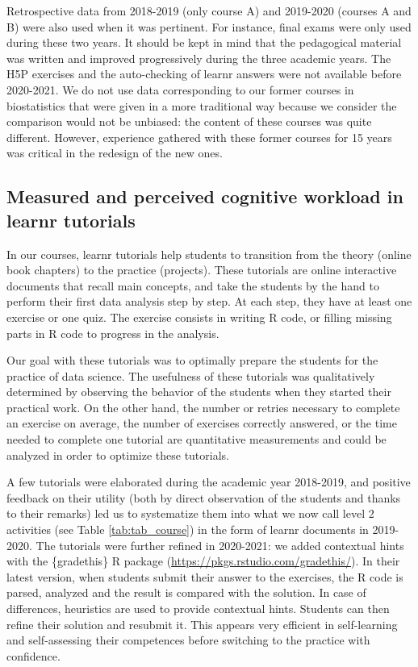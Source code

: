 \documentclass{aims}
\theoremstyle{definition}
\begin{document}
Retrospective data from 2018-2019 (only course A)
\cite{Grosjeandataset2018} and 2019-2020 (courses A and B)
\cite{Grosjeandataset2019} were also used when it was pertinent. For
instance, final exams were only used during these two years. It should
be kept in mind that the pedagogical material was written and improved
progressively during the three academic years. The H5P exercises and the
auto-checking of learnr answers were not available before 2020-2021. We
do not use data corresponding to our former courses in biostatistics
that were given in a more traditional way because we consider the
comparison would not be unbiased: the content of these courses was quite
different. However, experience gathered with these former courses for 15
years was critical in the redesign of the new ones.

\hypertarget{measured-and-perceived-cognitive-workload-in-learnr-tutorials-1}{%
\subsection{Measured and perceived cognitive workload in learnr
tutorials}\label{measured-and-perceived-cognitive-workload-in-learnr-tutorials-1}}

In our courses, learnr tutorials help students to transition from the
theory (online book chapters) to the practice (projects). These
tutorials are online interactive documents that recall main concepts,
and take the students by the hand to perform their first data analysis
step by step. At each step, they have at least one exercise or one quiz.
The exercise consists in writing R code, or filling missing parts in R
code to progress in the analysis.

Our goal with these tutorials was to optimally prepare the students for
the practice of data science. The usefulness of these tutorials was
qualitatively determined by observing the behavior of the students when
they started their practical work. On the other hand, the number or
retries necessary to complete an exercise on average, the number of
exercises correctly answered, or the time needed to complete one
tutorial are quantitative measurements and could be analyzed in order to
optimize these tutorials.

A few tutorials were elaborated during the academic year 2018-2019, and
positive feedback on their utility (both by direct observation of the
students and thanks to their remarks) led us to systematize them into
what we now call level 2 activities (see Table \ref {tab:tab_course}) in
the form of learnr documents in 2019-2020. The tutorials were further
refined in 2020-2021: we added contextual hints with the \{gradethis\} R
package (\url{https://pkgs.rstudio.com/gradethis/}). In their latest
version, when students submit their answer to the exercises, the R code
is parsed, analyzed and the result is compared with the solution. In
case of differences, heuristics are used to provide contextual hints.
Students can then refine their solution and resubmit it. This appears
very efficient in self-learning and self-assessing their competences
before switching to the practice with confidence.
\end{document}
